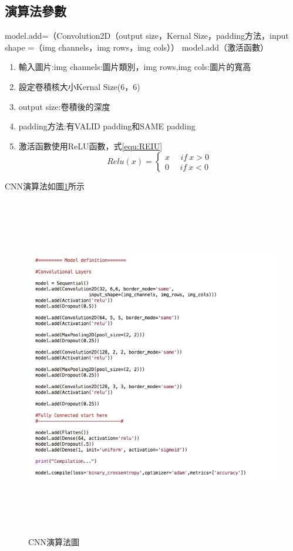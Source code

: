 \subsection{演算法參數}
model.add=（Convolution2D（output size，Kernal Size，padding方法，input shape =（img channels，img rows，img cols））
model.add（激活函數）
\begin{enumerate}
	\item
	      輸入圖片:img channels:圖片類別，img rows,img cols:圖片的寬高
	\item
	      設定卷積核大小Kernal Size(6，6)
	\item
	      output size:卷積後的深度
	\item
	      padding方法:有VALID padding和SAME padding
	\item
	      激活函數使用ReLU函數，式\ref{equ:REIU}
	      \begin{equation}
		      \label{equ:REIU}
			  Relu(x)= 
\left\{\begin{matrix}
x \ \ \ \ \ \ if\ x>0
\\ 
0 \ \ \ \ \ \ if\ x<0
\end{matrix}\right.
	      \end{equation}
\end{enumerate}
CNN演算法如圖\ref{fig:keras}所示
\begin{figure}[H]
	\centerline{\includegraphics[height=15cm]{pic/Keras.jpg}}
	\caption{CNN演算法圖}
	\label{fig:keras}
\end{figure}

